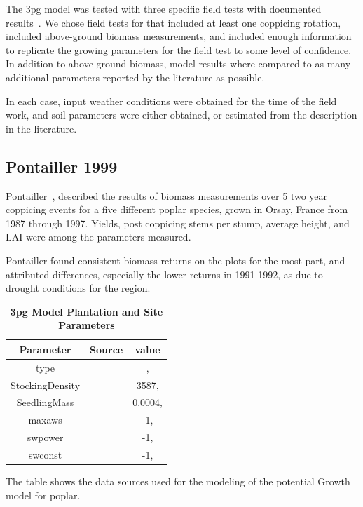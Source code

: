 \documentclass[10pt]{article}
\begin{document}


The \ac{3pg} model was tested with three specific field tests with
documented results~\cite{Proe2002,Proe1999,Pontailler1999,Afas2008a}.
We chose field tests for \pop that included at least one coppicing
rotation, included above-ground biomass measurements, and included
enough information to replicate the growing parameters for the field
test to some level of confidence.  In addition to above ground
biomass, model results where compared to as many additional parameters
reported by the literature as possible.

In each case, input weather conditions were obtained for the time of
the field work, and soil parameters were either obtained, or estimated
from the description in the literature.


\subsection*{Pontailler 1999}
\label{sec:pont}

Pontailler~\cite{Pontailler1999}, described the results of biomass
measurements over 5 two year coppicing events for a five different
poplar species, grown in Orsay, France from 1987 through 1997.
Yields, post coppicing stems per stump, average height, and \ac{LAI}
were among the parameters measured.

Pontailler found consistent biomass returns on the plots for the most
part, and attributed differences, especially the lower returns in
1991-1992, as due to drought conditions for the region.  

\begin{table}[!ht]
\caption{
\textbf{\ac{3pg} Model Plantation and Site Parameters}}
\begin{tabular}{|c|c|c|}
\hline
Parameter & Source & value\\
\hline
type &  & ,\\
StockingDensity &  & 3587,\\
SeedlingMass &  & 0.0004,\\
\hline
maxaws &  & -1,\\
swpower &  & -1,\\
swconst &  & -1,\\
\hline
\end{tabular}

\begin{flushleft}The table shows the data sources used for the
  modeling of the potential Growth model for poplar.
\end{flushleft}
\label{tab:3pg-plantation-site}
 \end{table}
\end{document}

